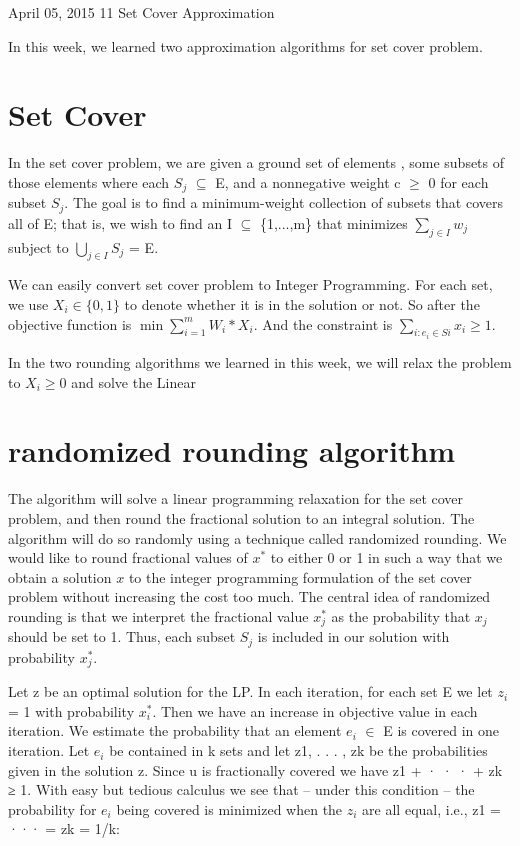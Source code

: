 \documentclass[usletter]{article}
\begin{document}
           {April 05, 2015}                          %
           {11}                                       %
           {Set Cover Approximation}  %

\noindent
In this week, we learned two approximation algorithms for set cover problem.

\section{Set Cover}
In the set cover problem, we are given a ground set of elements , some subsets of those elements where each  $S_{j}$ $\subseteq$ E, and a nonnegative weight c $\geq$ 0 for each subset $S_{j}$. The goal is to find a minimum-weight collection of subsets that covers all of
E; that is, we wish to find an I $\subseteq$ \{1,...,m\} that minimizes $\sum_{j \in I} w_{j}$ subject to $\bigcup_{j \in I} S_j$ = E.

We can easily convert set cover problem to  Integer Programming. For each set, we use $X_i \in \{0, 1\}$ to denote whether it is in the solution or not. So after the objective function is $\min{\sum_{i=1}^{m}{W_i * X_i}}$. And the constraint is 
$\sum_{i: e_i \in Si}{x_i} \ge 1$.

In the two rounding algorithms we learned in this week, we will relax the problem to $X_i \ge 0$ and solve the Linear 

\section{randomized rounding algorithm}
The algorithm will solve a linear programming relaxation for the set cover problem, and then round the fractional solution to an integral solution. The algorithm will do so randomly using a technique called randomized rounding. We would like to round fractional values of $x^*$ to either 0 or 1 in such a way that we obtain a solution $x$ to the integer programming formulation of the set cover problem without increasing the cost too much. The central idea of randomized rounding is that we interpret the fractional value $x_j^*$ as the probability that $x_j$ should be set to 1. Thus, each subset $S_j$ is included in our solution with probability $x^*_j$.

Let z be an optimal solution for the LP. In each iteration, for each set E we let $z_i$ = 1 with probability $x^*_i$. Then we have an increase in objective value in each iteration.
We estimate the probability that an element $e_i$ $\in$ E is covered in one iteration. Let $e_i$ be contained in k sets and let z1, . . . , zk be the probabilities given in the solution z. Since u is fractionally covered we have z1 + · · · + zk ≥ 1. With easy but tedious calculus we see that – under this condition – the probability for $e_i$ being covered is minimized when the $z_i$ are all equal, i.e., z1 = ··· = zk = 1/k:
\end{document}
